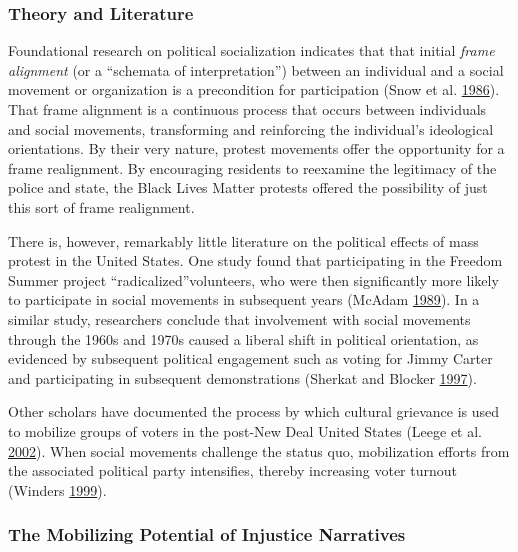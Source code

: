 \documentclass[
  12pt,
]{article}
\begin{document}
\hypertarget{theory-and-literature}{%
\subsubsection*{Theory and Literature}\label{theory-and-literature}}

Foundational research on political socialization indicates that that initial \emph{frame alignment} (or a ``schemata of interpretation'') between an individual and a social movement or organization is a precondition for participation (Snow et al. \protect\hyperlink{ref-Snow1986}{1986}). That frame alignment is a continuous process that occurs between individuals and social movements, transforming and reinforcing the individual's ideological orientations. By their very nature, protest movements offer the opportunity for a frame realignment. By encouraging residents to reexamine the legitimacy of the police and state, the Black Lives Matter protests offered the possibility of just this sort of frame realignment.

There is, however, remarkably little literature on the political effects of mass protest in the United States. One study found that participating in the Freedom Summer project ``radicalized''volunteers, who were then significantly more likely to participate in social movements in subsequent years (McAdam \protect\hyperlink{ref-McAdam1989}{1989}). In a similar study, researchers conclude that involvement with social movements through the 1960s and 1970s caused a liberal shift in political orientation, as evidenced by subsequent political engagement such as voting for Jimmy Carter and participating in subsequent demonstrations (Sherkat and Blocker \protect\hyperlink{ref-Sherkat1997}{1997}).

Other scholars have documented the process by which cultural grievance is used to mobilize groups of voters in the post-New Deal United States (Leege et al. \protect\hyperlink{ref-Leege2002}{2002}). When social movements challenge the status quo, mobilization efforts from the associated political party intensifies, thereby increasing voter turnout (Winders \protect\hyperlink{ref-Winders1999}{1999}).

\hypertarget{the-mobilizing-potential-of-injustice-narratives}{%
\subsubsection*{The Mobilizing Potential of Injustice Narratives}\label{the-mobilizing-potential-of-injustice-narratives}}
\end{document}
